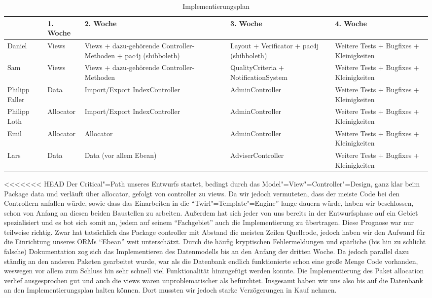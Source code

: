 \documentclass[parskip=full]{scrartcl}
\newcommand{\code}[1]{{\ttfamily #1}}
\begin{document}
\begin{table}[H]
\begin{tabularx}{\textwidth}{|l|l|X|X|X|}
\hline
 	& 1. Woche			& 2. Woche		& 3. Woche & 4. Woche\\
\hline 
Daniel	& Views			& Views + dazu-gehörende Controller-Methoden + pac4j 
(shibboleth) & Layout + Verificator
+ pac4j (shibboleth)& Weitere Tests +
Bugfixes +
Kleinigkeiten\\
\hline
Sam & Views&Views +
dazu-gehörende
Controller-
Methoden & QualityCriteria +
NotificationSystem & Weitere Tests +
Bugfixes +
Kleinigkeiten\\
\hline
Philipp Faller&Data&Import/Export
IndexController&AdminController&Weitere Tests +
Bugfixes +
Kleinigkeiten\\
\hline
Philipp Loth&Allocator&Import/Export
IndexController&AdminController&Weitere Tests +
Bugfixes +
Kleinigkeiten\\
\hline
Emil&Allocator&Allocator&AdminController&Weitere Tests +
Bugfixes +
Kleinigkeiten\\
\hline
Lars&Data&Data (vor allem
Ebean)&AdviserController&Weitere Tests +
Bugfixes +
Kleinigkeiten\\
\hline
\end{tabularx}
\caption{Implementierungsplan}
\end{table}
<<<<<<< HEAD
Der Critical"=Path unseres Entwurfs startet, bedingt durch das Model"=View"=Controller"=Design, ganz klar beim Package \code{data} und verläuft über \code{allocator}, gefolgt von \code{controller} zu  \code{views}.
Da wir jedoch vermuteten, dass der meiste Code bei den Controllern anfallen würde, sowie dass das Einarbeiten in die \enquote{Twirl"=Template"=Engine} lange dauern würde, haben wir beschlossen, schon von Anfang an diesen beiden Baustellen zu arbeiten. 
Außerdem hat sich jeder von uns bereits in der Entwurfsphase auf ein Gebiet spezialisiert und es bot sich somit an, jedem auf seinem \enquote{Fachgebiet} auch die Implementierung zu übertragen.
Diese Prognose war nur teilweise richtig.
Zwar hat tatsächlich das Package \code{controller} mit Abstand die meisten Zeilen Quellcode, jedoch haben wir den Aufwand für die Einrichtung unseres ORMs \enquote{Ebean} weit unterschätzt. 
Durch die häufig kryptischen Fehlermeldungen und spärliche (bis hin zu schlicht falsche) Dokumentation zog sich das Implementieren des Datenmodells bis an den Anfang der dritten Woche. 
Da jedoch parallel dazu ständig an den anderen Paketen gearbeitet wurde, war als die Datenbank endlich funktionierte schon eine große Menge Code vorhanden, weswegen vor allem zum Schluss hin sehr schnell viel Funktionalität hinzugefügt werden konnte.
Die Implementierung des Paket \code{allocation} verlief ausgesprochen gut und auch die \code{views} waren unproblematischer als befürchtet. 
Insgesamt haben wir uns also bis auf die Datenbank an den Implementierungsplan halten können. Dort mussten wir jedoch starke Verzögerungen in Kauf nehmen.
\end{document}
